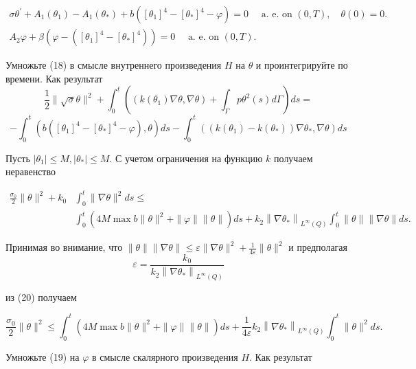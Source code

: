 \[
    \begin{gathered}
        \sigma \theta^{\prime}+A_{1}\left(\theta_{1}\right)
        -A_{1}\left(\theta_{*}\right)+b\left(\left[\theta_{1}\right]^{4}-
        \left[\theta_{*}\right]^{4}-\varphi\right)=0 \quad \text { a. e. on }(0, T), \quad \theta(0)=0 . \\
        A_{2} \varphi+\beta\left(\varphi-\left(\left[\theta_{1}\right]^{4}
        -\left[\theta_{*}\right]^{4}\right)\right)=0 \quad \text { a. e. on }(0, T).
    \end{gathered}
\]



Умножьте (18) в смысле внутреннего произведения $H$ на $\theta$ и проинтегрируйте по времени.
Как результат
\[
    \frac{1}{2}\|\sqrt{\sigma} \theta\|^{2}+
    \int_{0}^{t}\left(\left(k\left(\theta_{1}\right) \nabla \theta,
    \nabla \theta\right)+\int_{\Gamma} p \theta^{2}(s) d \Gamma\right) d s=
\]
\[
    -\int_{0}^{t}\left(b\left(\left[\theta_{1}\right]^{4}-\left[\theta_{*}\right]^{4}-\varphi\right),
    \theta\right) d s-\int_{0}^{t}\left(\left(k\left(\theta_{1}\right)-k\left(\theta_{*}\right)\right)
    \nabla \theta_{*}, \nabla \theta\right) d s
\]

Пусть $\left|\theta_{1}\right| \leq M,\left|\theta_{*}\right| \leq M$.
С учетом ограничения на функцию $k$ получаем неравенство

\[
    \begin{aligned}
        \frac{\sigma_{0}}{2}\|\theta\|^{2}+k_{0} & \int_{0}^{t}\|\nabla \theta\|^{2} d s \leq \\
        & \int_{0}^{t}\left(4 M \max b\|\theta\|^{2}+\|\varphi\|\|\theta\|\right) d s
        +k_{2}\left\|\nabla \theta_{*}\right\|_{L^{\infty}(Q)} \int_{0}^{t}\|\theta\|\|\nabla \theta\| d s.
    \end{aligned}
\]


Принимая во внимание, что
$\|\theta\|\|\nabla \theta\| \leq \varepsilon\|\nabla \theta\|^{2}+
\frac{1}{4 \varepsilon}\|\theta\|^{2}$
и предполагая
\[
    \varepsilon=\frac{k_{0}}{k_{2}\left\|\nabla \theta_{*}\right\|_{L^{\infty}(Q)}}
\]


из (20) получаем

\[
    \frac{\sigma_{0}}{2}\|\theta\|^{2} \leq \int_{0}^{t}
    \left(4 M \max b\|\theta\|^{2}+\|\varphi\|\|\theta\|\right) d s
    +\frac{1}{4 \varepsilon} k_{2}\left\|\nabla \theta_{*}\right\|_{L^{\infty}(Q)}
    \int_{0}^{t}\|\theta\|^{2} d s.
\]


Умножьте (19) на $\varphi$ в смысле скалярного произведения $H$.
Как результат

